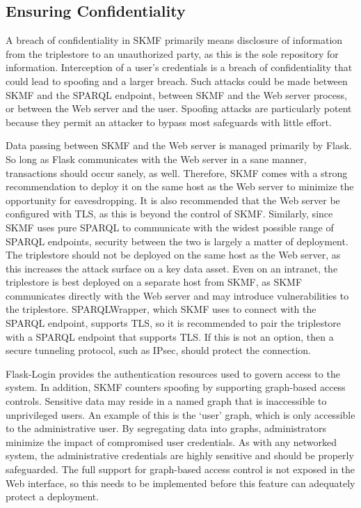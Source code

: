 \subsection{Ensuring Confidentiality}
\label{result:confidentiality}

A breach of confidentiality in SKMF primarily means disclosure of information from the triplestore to an unauthorized party, as this is the sole repository for information. Interception of a user's credentials is a breach of confidentiality that could lead to spoofing and a larger breach. Such attacks could be made between SKMF and the SPARQL endpoint, between SKMF and the Web server process, or between the Web server and the user. Spoofing attacks are particularly potent because they permit an attacker to bypass most safeguards with little effort.

Data passing between SKMF and the Web server is managed primarily by Flask. So long as Flask communicates with the Web server in a sane manner, transactions should occur sanely, as well. Therefore, SKMF comes with a strong recommendation to deploy it on the same host as the Web server to minimize the opportunity for eavesdropping. It is also recommended that the Web server be configured with TLS, as this is beyond the control of SKMF. Similarly, since SKMF uses pure SPARQL to communicate with the widest possible range of SPARQL endpoints, security between the two is largely a matter of deployment. The triplestore should not be deployed on the same host as the Web server, as this increases the attack surface on a key data asset. Even on an intranet, the triplestore is best deployed on a separate host from SKMF, as SKMF communicates directly with the Web server and may introduce vulnerabilities to the triplestore. SPARQLWrapper, which SKMF uses to connect with the SPARQL endpoint, supports TLS, so it is recommended to pair the triplestore with a SPARQL endpoint that supports TLS. If this is not an option, then a secure tunneling protocol, such as IPsec, should protect the connection.

Flask-Login provides the authentication resources used to govern access to the system. In addition, SKMF counters spoofing by supporting graph-based access controls. Sensitive data may reside in a named graph that is inaccessible to unprivileged users. An example of this is the `user' graph, which is only accessible to the administrative user. By segregating data into graphs, administrators minimize the impact of compromised user credentials. As with any networked system, the administrative credentials are highly sensitive and should be properly safeguarded. The full support for graph-based access control is not exposed in the Web interface, so this needs to be implemented before this feature can adequately protect a deployment.


